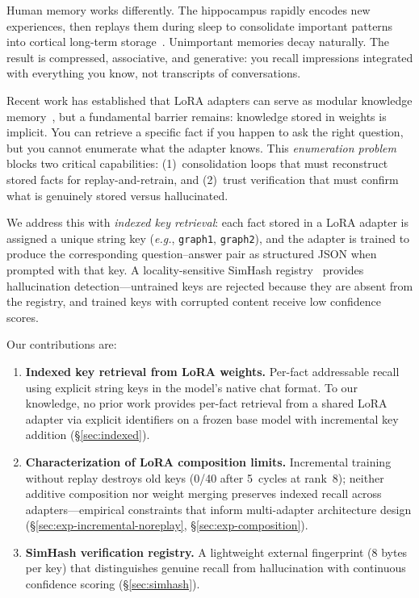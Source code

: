\documentclass[11pt]{article}
\newcommand{\eg}{\textit{e.g.}}
\begin{document}
Human memory works differently.
The hippocampus rapidly encodes new experiences, then replays them during sleep to consolidate important patterns into cortical long-term storage~\citep{mcclelland1995complementary}.
Unimportant memories decay naturally.
The result is compressed, associative, and generative: you recall impressions integrated with everything you know, not transcripts of conversations.

Recent work has established that LoRA adapters can serve as modular knowledge memory~\citep{back2026understanding,singhal2025naacl}, but a fundamental barrier remains: knowledge stored in weights is implicit.
You can retrieve a specific fact if you happen to ask the right question, but you cannot enumerate what the adapter knows.
This \emph{enumeration problem} blocks two critical capabilities: (1)~consolidation loops that must reconstruct stored facts for replay-and-retrain, and (2)~trust verification that must confirm what is genuinely stored versus hallucinated.

We address this with \emph{indexed key retrieval}: each fact stored in a LoRA adapter is assigned a unique string key (\eg, \texttt{graph1}, \texttt{graph2}), and the adapter is trained to produce the corresponding question--answer pair as structured JSON when prompted with that key.
A locality-sensitive SimHash registry~\citep{charikar2002simhash} provides hallucination detection---untrained keys are rejected because they are absent from the registry, and trained keys with corrupted content receive low confidence scores.

Our contributions are:
\begin{enumerate}
    \item \textbf{Indexed key retrieval from LoRA weights.} Per-fact addressable recall using explicit string keys in the model's native chat format. To our knowledge, no prior work provides per-fact retrieval from a shared LoRA adapter via explicit identifiers on a frozen base model with incremental key addition (\S\ref{sec:indexed}).
    \item \textbf{Characterization of LoRA composition limits.} Incremental training without replay destroys old keys (0/40 after 5~cycles at rank~8); neither additive composition nor weight merging preserves indexed recall across adapters---empirical constraints that inform multi-adapter architecture design (\S\ref{sec:exp-incremental-noreplay}, \S\ref{sec:exp-composition}).
    \item \textbf{SimHash verification registry.} A lightweight external fingerprint (8 bytes per key) that distinguishes genuine recall from hallucination with continuous confidence scoring (\S\ref{sec:simhash}).
\end{enumerate}
\end{document}
